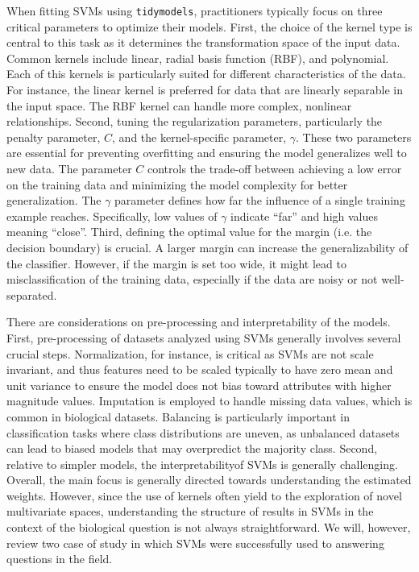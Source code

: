 When fitting SVMs using \texttt{tidymodels}, practitioners typically focus
on three critical parameters to optimize their models. First, the choice
of the kernel type is central to this task as it determines the
transformation space of the input data. Common kernels include linear,
radial basis function (RBF), and polynomial. Each of this kernels is
particularly suited for different characteristics of the data. For
instance, the linear kernel is preferred for data that are linearly
separable in the input space. The RBF kernel can handle more complex,
nonlinear relationships. Second, tuning the regularization parameters,
particularly the penalty parameter, $C$, and
the kernel-specific parameter, $\gamma$.
These two parameters are essential for preventing overfitting and
ensuring the model generalizes well to new data. The parameter
$C$ controls the trade-off between achieving
a low error on the training data and minimizing the model complexity for
better generalization. The
$\gamma$ parameter defines how far the
influence of a single training example reaches. Specifically, low values
of $\gamma$ indicate ``far'' and high values
meaning ``close''. Third, defining the optimal value for the margin (i.e.
the decision boundary) is crucial. A larger margin can increase the
generalizability of the classifier. However, if the margin is set too
wide, it might lead to misclassification of the training data,
especially if the data are noisy or not well-separated.

There are considerations on pre-processing and interpretability of
the models. First, pre-processing of datasets analyzed using SVMs
generally involves several crucial steps. Normalization, for instance,
is critical as SVMs are not scale invariant, and thus features need to
be scaled typically to have zero mean and unit variance to ensure the
model does not bias toward attributes with higher magnitude values.
Imputation is employed to handle missing data values, which is common in
biological datasets. Balancing is particularly important in
classification tasks where class distributions are uneven, as unbalanced
datasets can lead to biased models that may overpredict the majority
class. Second, relative to simpler models, the interpretabilityof SVMs
is generally challenging. Overall, the main focus is generally directed
towards understanding the estimated weights. However, since the use of
kernels often yield to the exploration of novel multivariate spaces,
understanding the structure of results in SVMs in the context of the
biological question is not always straightforward. We will, however,
review two case of study in which SVMs were successfully used to
answering questions in the field.

